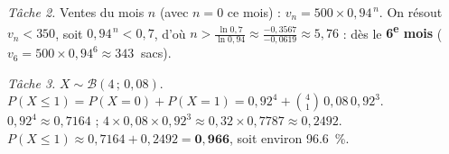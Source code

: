 \emph{Tâche 2.} Ventes du mois $n$ (avec $n=0$ ce mois) : $v_n=500\times0{,}94^{\,n}$. On résout $v_n<350$,
soit $0{,}94^{\,n}<0{,}7$, d'où $n>\frac{\ln0{,}7}{\ln0{,}94}\approx\frac{-0{,}3567}{-0{,}0619}\approx5{,}76$ :
dès le \textbf{6\textsuperscript{e} mois} ($v_6=500\times0{,}94^{6}\approx\SI{343}{}$ sacs).

\emph{Tâche 3.} $X\sim\mathcal B(4\,;\,0{,}08)$. $P(X\le1)=P(X{=}0)+P(X{=}1)=0{,}92^4+\binom41\,0{,}08\,0{,}92^3$.
$0{,}92^4\approx0{,}7164$ ; $4\times0{,}08\times0{,}92^3\approx0{,}32\times0{,}7787\approx0{,}2492$.
$P(X\le1)\approx0{,}7164+0{,}2492=\mathbf{0{,}966}$, soit environ \SI{96,6}{\percent}.
